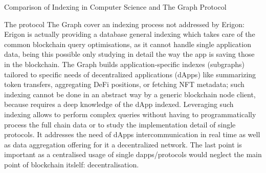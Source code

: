 \documentclass[11pt,a4paper,titlepage]{scrartcl}
\begin{document}
\begin{table}[H] %
\centering
\caption{Comparison of Indexing in Computer Science and The Graph Protocol}
\captionsetup{font=footnotesize, justification=centering}
\caption*{\footnotesize This table compares the roles of indexing in general computer science and The Graph Protocol, highlighting key differences in purpose, mechanisms, and scalability.}
\label{tab:indexing_comparison}
\end{table}

The protocol The Graph cover  an indexing process not addressed  by Erigon: Erigon is actually providing a database general indexing which takes care of the common blockchain query optimisations, as it cannot handle single application data, being this possible only studying in detail the way the app is saving those in the blockchain.
The Graph builds application-specific indexes (subgraphs) tailored to specific needs of decentralized applications (dApps) like summarizing token transfers, aggregating DeFi positions, or fetching NFT metadata; such indexing cannot be done in an abstract  way by a generic blockchain node client, because requires a deep knowledge of the dApp indexed. Leveraging such indexing allows to perform complex queries without having to programmatically process the full chain data or to study the implementation detail of single protocols. It addresses the need of  dApps intercommunication in real time as well as data aggregation offering for it a decentralized network. The last point is important as a centralised usage of single dapps/protocols would neglect the main point of blockchain itslelf: decentralisation. 
\end{document}
